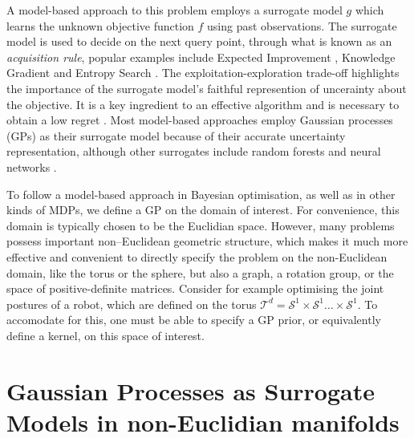 A model-based approach to this problem employs a surrogate model $g$ which learns the unknown objective function $f$ using past observations. The surrogate model is used to decide on the next query point, through what is known as an \emph{acquisition rule},
popular examples include Expected Improvement \citep{jones1998efficient}, Knowledge Gradient \citep{frazier2009knowledge} and Entropy Search \citep{hennig2012entropy}. The exploitation-exploration trade-off highlights the importance of the surrogate model's faithful represention of uncerainty about the objective. It is a key ingredient to an effective algorithm and is necessary to obtain a low regret \citep{srinivas2009gaussian}. Most model-based approaches employ Gaussian processes (GPs) as their surrogate model because of their accurate uncertainty representation, although other surrogates include random forests \citep{hutter2014efficient} and neural networks \citep{snoek2015scalable}.

To follow a model-based approach in Bayesian optimisation, as well as in other kinds of MDPs, we define a GP on the domain of interest. For convenience, this domain is typically chosen to be the Euclidian space. However, many problems possess important non–Euclidean geometric structure, which makes it much more effective and convenient to directly specify the problem on the non-Euclidean domain, like the torus or the sphere, but also a graph, a rotation group, or the space of positive-definite matrices. Consider for example optimising the joint postures of a robot, which are defined on the torus $\mathcal{T}^d = \mathcal{S}^1 \times \mathcal{S}^1 \ldots \times \mathcal{S}^1$. To accomodate for this, one must be able to specify a GP prior, or equivalently define a kernel, on this space of interest.

\section{Gaussian Processes as Surrogate Models in non-Euclidian manifolds}
\label{sec:gp-noneuclidian}


